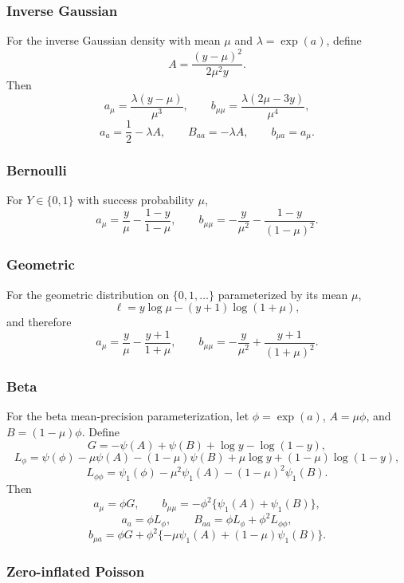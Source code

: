 \documentclass{article}
\begin{document}
\subsubsection*{Inverse Gaussian}

For the inverse Gaussian density with mean $\mu$ and
$\lambda=\exp(a)$, define
\[
    A=\frac{(y-\mu)^2}{2\mu^2y}.
\]
Then
\[
    a_\mu=\frac{\lambda(y-\mu)}{\mu^3},\qquad
    b_{\mu\mu}=\frac{\lambda(2\mu-3y)}{\mu^4},
\]
\[
    a_a=\frac12-\lambda A,\qquad
    B_{aa}=-\lambda A,\qquad
    b_{\mu a}=a_\mu.
\]

\subsubsection*{Bernoulli}

For $Y\in\{0,1\}$ with success probability $\mu$,
\[
    a_\mu=\frac{y}{\mu}-\frac{1-y}{1-\mu},\qquad
    b_{\mu\mu}=-\frac{y}{\mu^2}-\frac{1-y}{(1-\mu)^2}.
\]

\subsubsection*{Geometric}

For the geometric distribution on $\{0,1,\ldots\}$ parameterized by its mean
$\mu$,
\[
    \ell=y\log\mu-(y+1)\log(1+\mu),
\]
and therefore
\[
    a_\mu=\frac{y}{\mu}-\frac{y+1}{1+\mu},\qquad
    b_{\mu\mu}=-\frac{y}{\mu^2}+\frac{y+1}{(1+\mu)^2}.
\]

\subsubsection*{Beta}

For the beta mean-precision parameterization, let
$\phi=\exp(a)$, $A=\mu\phi$, and $B=(1-\mu)\phi$.  Define
\[
    G=-\psi(A)+\psi(B)+\log y-\log(1-y),
\]
\[
    L_\phi
    =
    \psi(\phi)-\mu\psi(A)-(1-\mu)\psi(B)
    +\mu\log y+(1-\mu)\log(1-y),
\]
\[
    L_{\phi\phi}
    =
    \psi_1(\phi)-\mu^2\psi_1(A)-(1-\mu)^2\psi_1(B).
\]
Then
\[
    a_\mu=\phi G,\qquad
    b_{\mu\mu}=-\phi^2\{\psi_1(A)+\psi_1(B)\},
\]
\[
    a_a=\phi L_\phi,\qquad
    B_{aa}=\phi L_\phi+\phi^2L_{\phi\phi},
\]
\[
    b_{\mu a}
    =
    \phi G+\phi^2\{-\mu\psi_1(A)+(1-\mu)\psi_1(B)\}.
\]

\subsubsection*{Zero-inflated Poisson}
\end{document}
